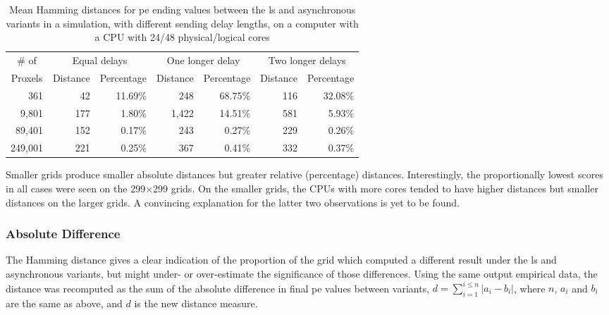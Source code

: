 \begin{table}
\centering
\begin{tabular}{@{}r|rr|rr|rr@{}}
\toprule
\multicolumn{1}{c|}{\# of}   & \multicolumn{2}{c|}{Equal delays} & \multicolumn{2}{c|}{One longer delay} & \multicolumn{2}{c}{Two longer delays} \\ \cmidrule(l){2-7} 
\multicolumn{1}{c|}{Proxels} & Distance     & Percentage     & Distance      & Percentage      & Distance      & Percentage      \\ \midrule
361  & 42  & 11.69\% & 248  & 68.75\% & 116  & 32.08\% \\
9,801  & 177  & 1.80\% & 1,422  & 14.51\% & 581  & 5.93\% \\
89,401  & 152  & 0.17\% & 243  & 0.27\% & 229  & 0.26\% \\
249,001  & 221  & 0.25\% & 367  & 0.41\% & 332  & 0.37\% \\ \bottomrule
\end{tabular}%
\caption[Mean Hamming distances for  ending values between the \gls{ls} and asynchronous variants on a 48-core CPU]{Mean Hamming distances for \gls{pe} ending values between the \gls{ls} and asynchronous variants in a simulation, with different sending delay lengths, on a computer with a CPU with 24/48 physical/logical cores}
\label{tab:nmp:hamming48cores}
\end{table}

Smaller grids produce smaller absolute distances but greater relative (percentage) distances.  Interestingly, the proportionally lowest scores in all cases were seen on the 299×299 grids.  On the smaller grids, the CPUs with more cores tended to have higher distances but smaller distances on the larger grids.  A convincing explanation for the latter two observations is yet to be found.

\subsubsection{Absolute Difference}
The Hamming distance gives a clear indication of the proportion of the grid which computed a different result under the \gls{ls} and asynchronous variants, but might under- or over-estimate the significance of those differences.  Using the same output empirical data, the distance was recomputed as the sum of the absolute difference in final \gls{pe} values between variants, \ie{} \( d = \sum_{i = 1}^{i \leq n} |a_i - b_i| \), where \(n\), \(a_i\) and \(b_i\) are the same as above, and \(d\) is the new distance measure.

